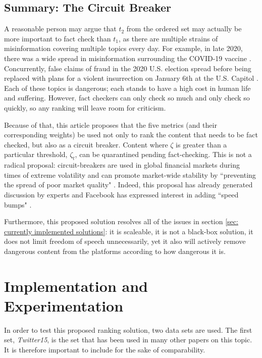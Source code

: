 \documentclass[preprint,review,12pt]{elsarticle}
\begin{document}
\subsection{Summary: The Circuit Breaker}
A reasonable person may argue that $t_2$ from the ordered set may actually be more important to fact check than $t_1$, as there are multiple strains of misinformation covering multiple topics every day.  For example, in late 2020, there was a wide spread in misinformation surrounding the COVID-19 vaccine \cite{mills2020covid,bagherpour2020covid}. Concurrently, false claims of fraud in the 2020 U.S. election \cite{dean2020facebook} spread before being replaced with plans for a violent insurrection on January 6th at the U.S. Capitol \cite{fandos2021trump,Levenson2021capitol}. Each of these topics is dangerous; each stands to have a high cost in human life and suffering. However, fact checkers can only check so much and only check so quickly, so any ranking will leave room for criticism.

Because of that, this article proposes that the five metrics (and their corresponding weights) be used not only to rank the content that needs to be fact checked, but also as a circuit breaker. Content where $\zeta$ is greater than a particular threshold, $\zeta_t$, can be quarantined pending fact-checking. This is not a radical proposal: circuit-breakers are used in global financial markets during times of extreme volatility \cite{wang2019microstructure,schwert1990stock} and can promote market-wide stability by ``preventing the spread of poor market quality" \cite{brugler2014single,schneider2020stock}. Indeed, this proposal has already generated discussion by experts \cite{goodman2020digital,simpson2020fighting} and Facebook has expressed interest in adding ``speed bumps" \cite{bond2020circuit}.

Furthermore, this proposed solution resolves all of the issues in section \ref{sec: currently implemented solutions}: it is scaleable, it is not a black-box solution, it does not limit freedom of speech unnecessarily, yet it also will actively remove dangerous content from the platforms according to how dangerous it is.

\section{Implementation and Experimentation}
In order to test this proposed ranking solution, two data sets are used. The first set, \textit{Twitter15}, is the set that has been used in many other papers on this topic. It is therefore important to include for the sake of comparability.
\end{document}
